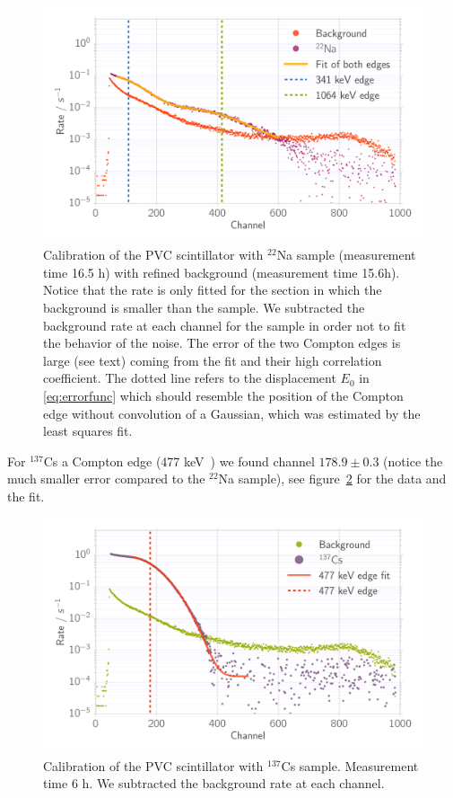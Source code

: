 \begin{figure}[htpb]
    \centering
    \includegraphics[width=0.9\linewidth]{./analysis/figures/calib_ps_na}
    \caption{Calibration of the PVC scintillator with
        $^{22}$Na sample (measurement time
    16.5 h) with refined background (measurement time 15.6h).
    Notice that the rate is 
    only fitted for the section in which the background is
    smaller than the sample. We
    subtracted the background rate at each channel
    for the sample in order not to fit the 
    behavior of the noise. The error of the two
    Compton edges is large (see text) coming
    from the fit and their high correlation coefficient. The 
dotted line refers to the displacement $E_0$ in \eqref{eq:errorfunc} which should resemble the position of the Compton
edge without convolution of a Gaussian, which was estimated
by the least squares fit.}
\label{fig:calib_ps_na}
\end{figure}
For $^{137}$Cs a Compton edge (477 keV~\cite{nist})
we found channel $178.9 \pm 0.3$ 
(notice the much smaller error compared to the $^{22}$Na sample), 
see figure~\ref{fig:calib_ps_cs} for the data and the fit.
\begin{figure}[htpb]
    \centering
    \includegraphics[width=0.9\linewidth]{./analysis/figures/calib_ps_cs}
    \caption{Calibration of the PVC scintillator with $^{137}$Cs sample. Measurement time
    6 h. We subtracted the background rate at each channel. }
\label{fig:calib_ps_cs}
\end{figure}

